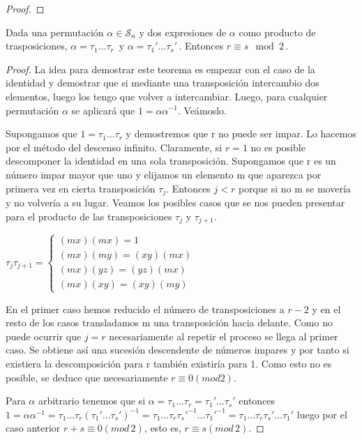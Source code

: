 \begin{proof}

\end{proof}

\begin{nth}\label{theorem:paridad-permutacion} 
Dada una permutación $\alpha \in \mathcal S_n$ y dos expresiones de $\alpha$ como producto de trasposiciones, $\alpha = \tau_1\hdots\tau_r$\, y $\alpha = \tau_1'\hdots\tau_s'$\,. Entonces $r \equiv s \mod 2$\,.
\end{nth}

\begin{proof}
La idea para demostrar este teorema es empezar con el caso de la identidad y demostrar que si mediante una transposición intercambio dos elementos, luego los tengo que volver a intercambiar. Luego, para cualquier permutación $\alpha$ se aplicará que $1 = \alpha\alpha^{-1}$. Veámoslo.

Supongamos que $1 = \tau_1...\tau_r$ y demostremos que r no puede ser impar. Lo hacemos por el método del descenso infinito. Claramente, si $r = 1$ no es posible descomponer la identidad en una sola transposición. Supongamos que r es un número impar mayor que uno y elijamos un elemento m que aparezca por primera vez en cierta transposición $\tau_j$. Entonces $j < r$ porque si no m se movería y no volvería a su lugar. Veamos los posibles casos que se nos pueden presentar para el producto de las transposiciones $\tau_j$ y $\tau_{j+1}$.

$\tau_j\tau_{j+1}=
\begin{cases}
(mx)(mx) = 1 \\
(mx)(my) = (xy)(mx) \\
(mx)(yz) = (yz)(mx) \\
(mx)(xy) = (xy)(my)
\end{cases}$

En el primer caso hemos reducido el número de transposiciones a $r-2$ y en el resto de los casos transladamos m una transposición hacia delante. Como no puede ocurrir que $j = r$ necesariamente al repetir el proceso se llega al primer caso. Se obtiene así una sucesión descendente de números impares y por tanto si existiera la descomposición para r también existiría para 1. Como esto no es posible, se deduce que necesariamente $r \equiv 0 (mod 2)$.

Para $\alpha$ arbitrario tenemos que si $\alpha = \tau_1...\tau_r = \tau_1'...\tau_s'$ entonces $1 = \alpha\alpha^{-1} = \tau_1...\tau_r(\tau_1'...\tau_s')^{-1} = \tau_1...\tau_r\tau_s'^{-1}...\tau_1'^{-1} = \tau_1...\tau_r\tau_s'...\tau_1'$ luego por el caso anterior $r+s \equiv 0 (mod \, 2)$, esto es, $r \equiv s (mod \, 2)$.
\end{proof}


